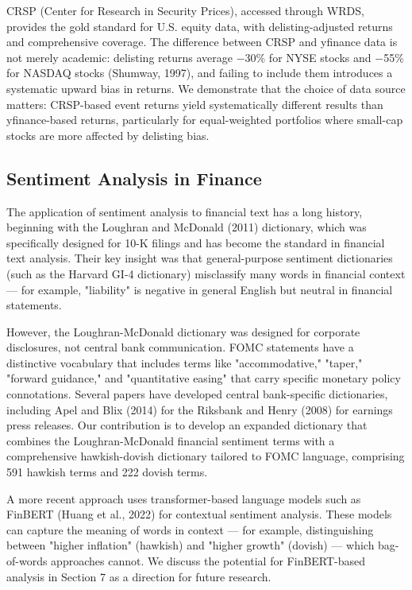 \documentclass[12pt]{article}
\begin{document}
CRSP (Center for Research in Security Prices), accessed through WRDS, provides the gold standard for U.S. equity data, with delisting-adjusted returns and comprehensive coverage. The difference between CRSP and yfinance data is not merely academic: delisting returns average $-$30\% for NYSE stocks and $-$55\% for NASDAQ stocks (Shumway, 1997), and failing to include them introduces a systematic upward bias in returns. We demonstrate that the choice of data source matters: CRSP-based event returns yield systematically different results than yfinance-based returns, particularly for equal-weighted portfolios where small-cap stocks are more affected by delisting bias.

\subsection{Sentiment Analysis in Finance}

The application of sentiment analysis to financial text has a long history, beginning with the Loughran and McDonald (2011) dictionary, which was specifically designed for 10-K filings and has become the standard in financial text analysis. Their key insight was that general-purpose sentiment dictionaries (such as the Harvard GI-4 dictionary) misclassify many words in financial context --- for example, "liability" is negative in general English but neutral in financial statements.

However, the Loughran-McDonald dictionary was designed for corporate disclosures, not central bank communication. FOMC statements have a distinctive vocabulary that includes terms like "accommodative," "taper," "forward guidance," and "quantitative easing" that carry specific monetary policy connotations. Several papers have developed central bank-specific dictionaries, including Apel and Blix (2014) for the Riksbank and Henry (2008) for earnings press releases. Our contribution is to develop an expanded dictionary that combines the Loughran-McDonald financial sentiment terms with a comprehensive hawkish-dovish dictionary tailored to FOMC language, comprising 591 hawkish terms and 222 dovish terms.

A more recent approach uses transformer-based language models such as FinBERT (Huang et al., 2022) for contextual sentiment analysis. These models can capture the meaning of words in context --- for example, distinguishing between "higher inflation" (hawkish) and "higher growth" (dovish) --- which bag-of-words approaches cannot. We discuss the potential for FinBERT-based analysis in Section 7 as a direction for future research.
\end{document}
